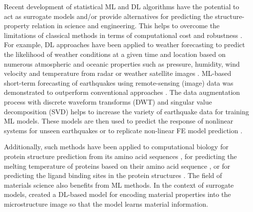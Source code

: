 \documentclass[11pt, authoryear]{elsarticle}
\renewcommand\textcolor[2]{#2}
\begin{document}
	Recent development of statistical \gls{ML} and \gls{DL} algorithms have the 
	potential to act as surrogate models and/or provide alternatives for predicting 
	the structure-property relation in science and engineering.
	This helps to 
	overcome the limitations of classical methods in terms of computational cost 
	and robustness \citep{jung2019efficient,wei2019machine, gupta2023data}. 
	For example, \gls{DL} approaches have been applied to weather forecasting to predict 
	the likelihood of weather conditions at a given time and location based on 
	numerous atmospheric and oceanic properties such as pressure, humidity, wind 
	velocity and temperature from radar or weather satellite images 
	\citep{espeholt2022deep}. ML-based short-term forecasting of earthquakes using 
	remote-sensing (image) data was demonstrated to outperform conventional approaches 
	\citep{xiong2021towards}.
	\textcolor{red}{The data augmentation process with discrete waveform transforms (DWT) and singular value decomposition (SVD) helps to increase the variety of earthquake data for 
		training \gls{ML} models. These models are then used to predict the response of nonlinear systems for unseen earthquakes or to replicate non-linear FE model prediction \citep{parida2023earthquake, parida2023svd}.
	}
	Additionally, such methods have been applied to computational biology 
	\citep{sapoval2022current} for protein structure prediction from its amino acid 
	sequences \citep{jumper2021highly, tunyasuvunakool2021highly}, for predicting
	the melting temperature of proteins based on their amino acid sequence 
	\citep{gorania2010predicting}, or for predicting the ligand binding sites in 
	the protein structures \citep{kandel2021puresnet}. 
	The field of materials science also benefits from \gls{ML} methods. 
	In the context of surrogate models, \citet{nakka2023generalised} created a 
	\gls{DL}-based model for encoding material properties into the microstructure 
	image so that the model learns material information. 
\end{document}

